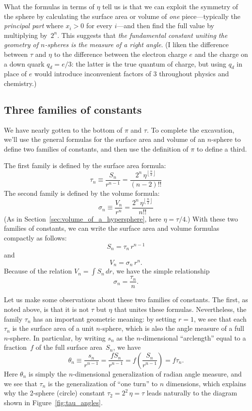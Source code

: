 What the formulas in terms of $\eta$ tell us is that we can exploit the symmetry of the sphere by calculating the surface area or volume of \emph{one} piece---typically the \emph{principal part} where $x_i > 0$ for every $i$---and then find the full value by multiplying by~$2^n$. This suggests that \emph{the fundamental constant uniting the geometry of $n$-spheres is the measure of a right angle}. (I liken the difference between $\tau$ and $\eta$ to the difference between the electron charge $e$ and the charge on a down quark $q_d = e/3$: the latter is the true quantum of charge, but using $q_d$ in place of $e$ would introduce inconvenient factors of $3$ throughout physics and chemistry.)


  \subsection{Three families of constants} %
  \label{sec:three_families_of_constants}

We have nearly gotten to the bottom of $\pi$ and $\tau$. To complete the excavation, we'll use the general formulas for the surface area and volume of an $n$-sphere to define two families of constants, and then use the definition of $\pi$ to define a third.

The first family is defined by the surface area formula:
\[
\tau_n \equiv \frac{S_n}{r^{n-1}} = \frac{2^n\,\eta^{\left\lfloor \frac{n}{2} \right\rfloor}}{(n-2)!!}
\]
The second family is defined by the volume formula:
\[
\sigma_n \equiv \frac{V_n}{r^n} = \frac{2^n\,\eta^{\left\lfloor \frac{n}{2} \right\rfloor}}{n!!}
\]
(As in Section~\ref{sec:volume_of_a_hypersphere}, here $\eta = \tau/4$.)
With these two families of constants, we can write the surface area and volume formulas compactly as follows:
\[ S_n = \tau_n\,r^{n-1} \]
and
\[ V_n = \sigma_n\,r^n. \]
Because of the relation $V_n = \int S_n\,dr$, we have the simple relationship
\[
\sigma_n = \frac{\tau_n}{n}.
\]

Let us make some observations about these two families of constants. The first, as noted above, is that it is not $\tau$ but $\eta$ that unites these formulas. Nevertheless, the family $\tau_n$ has an important geometric meaning: by setting $r=1$, we see that each $\tau_n$ is the surface area of a unit $n$-sphere, which is also the angle measure of a full $n$-sphere. In particular, by writing $s_n$ as the $n$-dimensional ``arclength'' equal to a fraction~$f$ of the full surface area~$S_n$, we have
\[
\theta_n \equiv \frac{s_n}{r^{n-1}} = \frac{f S_n}{r^{n-1}} = f\left(\frac{S_n}{r^{n-1}}\right) = f\tau_n.
\]
Here $\theta_n$ is simply the $n$-dimensional generalization of radian angle measure, and we see that $\tau_n$ is the generalization of ``one turn'' to $n$ dimensions, which explains why the 2-sphere (circle) constant $\tau_2 = 2^2\,\eta = \tau$ leads naturally to the diagram shown in Figure~\ref{fig:tau_angles}.

